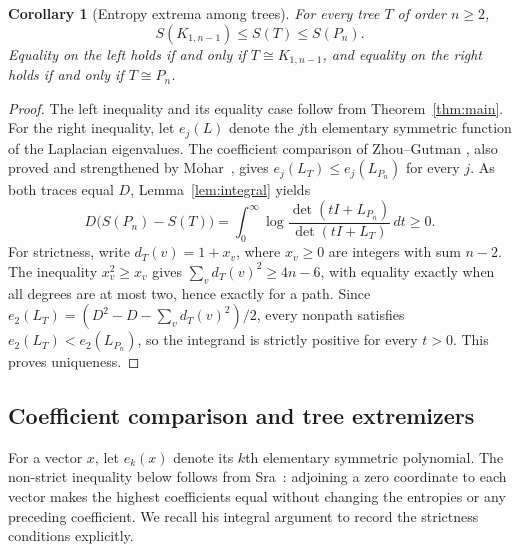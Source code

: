 \documentclass[11pt,a4paper,reqno]{amsart}
\newtheorem{corollary}[theorem]{Corollary}
\theoremstyle{remark}
\newcommand{\Ent}{S}
\numberwithin{equation}{section}
\begin{document}
\begin{corollary}[Entropy extrema among trees]\label{thm:trees}
For every tree $T$ of order $n\ge2$,
\[
 \Ent(K_{1,n-1})\le\Ent(T)\le\Ent(P_n).
\]
Equality on the left holds if and only if $T\cong K_{1,n-1}$, and
equality on the right holds if and only if $T\cong P_n$.
\end{corollary}
\begin{proof}
The left inequality and its equality case follow from
Theorem~\ref{thm:main}. For the right inequality, let $e_j(L)$ denote
the $j$th elementary symmetric function of the Laplacian eigenvalues.
The coefficient comparison of Zhou--Gutman
\cite[Theorems 7 and 8]{ZhouGutman2008}, also proved and strengthened
by Mohar~\cite[Eq.~(2)]{Mohar2007}, gives
$e_j(L_T)\le e_j(L_{P_n})$ for every $j$.
As both traces equal $D$, Lemma~\ref{lem:integral} yields
\[
 D\bigl(\Ent(P_n)-\Ent(T)\bigr)
 =\int_0^\infty\log\frac{\det(tI+L_{P_n})}{\det(tI+L_T)}\,dt\ge0.
\]
For strictness, write $d_T(v)=1+x_v$, where $x_v\ge0$ are integers
with sum $n-2$. The inequality $x_v^2\ge x_v$ gives
$\sum_vd_T(v)^2\ge4n-6$, with equality exactly when all degrees
are at most two, hence exactly for a path. Since
$e_2(L_T)=(D^2-D-\sum_vd_T(v)^2)/2$, every nonpath satisfies
$e_2(L_T)<e_2(L_{P_n})$, so the integrand is
strictly positive for every $t>0$. This proves uniqueness.
\end{proof}

\subsection{Coefficient comparison and tree extremizers}
\label{sec:renyi-extension}

For a vector $x$, let $e_k(x)$ denote its $k$th elementary symmetric
polynomial. The non-strict inequality below follows from
Sra~\cite[Theorem 2.3]{Sra2019}: adjoining a zero coordinate to each
vector makes the highest coefficients equal without changing the
entropies or any preceding coefficient. We recall his integral
argument to record the strictness conditions explicitly.
\end{document}

